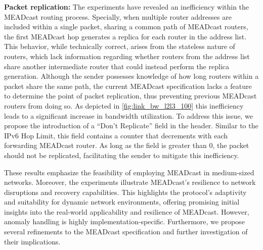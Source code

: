 \begin{itemize}
    \textbf{Packet replication:}
    The experiments have revealed an inefficiency within the MEADcast routing
        process.
    Specially, when multiple router addresses are included within a single
        packet, sharing a common path of MEADcast routers, the first MEADcast
        hop generates a replica for each router in the address list.
    This behavior, while technically correct, arises from the stateless nature
        of routers, which lack information regarding whether routers from the
        address list share another intermediate router that could instead
        perform the replica generation.
    Although the sender possesses knowledge of how long routers within a packet
        share the same path, the current MEADcast specification lacks a feature
        to determine the point of packet replication, thus preventing previous
        MEADcast routers from doing so.
    As depicted in \autoref{fig:link_bw_l2l3_100} this inefficiency leads to a
        significant increase in bandwidth utilization.
    To address this issue, we propose the introduction of a ``Don't Replicate''
        field in the header.
    Similar to the IPv6 Hop Limit, this field contains a counter that
        decrements with each forwarding MEADcast router.
    As long as the field is greater than 0, the packet should not be
        replicated, facilitating the sender to mitigate this inefficiency.

    These results emphasize the feasibility of employing MEADcast in
        medium-sized networks.
    Moreover, the experiments illustrate MEADcast's resilience to network
        disruptions and recovery capabilities.
    This highlights the protocol's adaptivity and suitability for dynamic
        network environments, offering promising initial insights into the
        real-world applicability and resilience of MEADcast.
    However, anomaly handling is highly implementation-specific.
    Furthermore, we propose several refinements to the MEADcast specification
        and further investigation of their implications.
\end{itemize}

